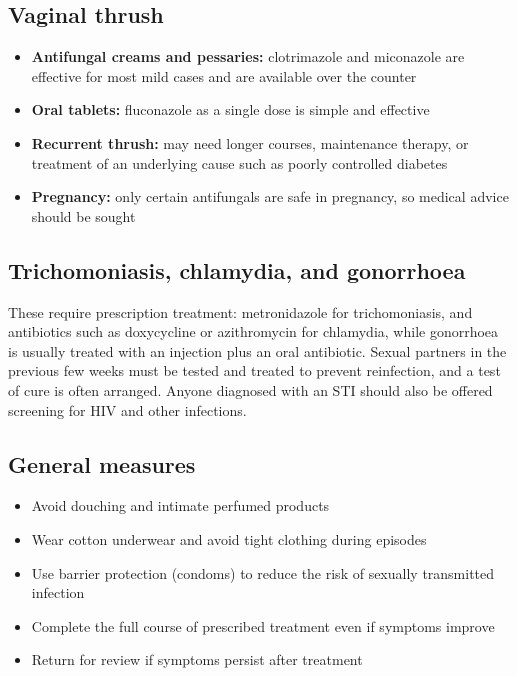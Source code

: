 \subsection*{Vaginal thrush}
\begin{itemize}
    \item \textbf{Antifungal creams and pessaries:} clotrimazole and miconazole are effective for most mild cases and are available over the counter
    \item \textbf{Oral tablets:} fluconazole as a single dose is simple and effective
    \item \textbf{Recurrent thrush:} may need longer courses, maintenance therapy, or treatment of an underlying cause such as poorly controlled diabetes
    \item \textbf{Pregnancy:} only certain antifungals are safe in pregnancy, so medical advice should be sought
\end{itemize}

\subsection*{Trichomoniasis, chlamydia, and gonorrhoea}
These require prescription treatment: metronidazole for trichomoniasis, and antibiotics such as doxycycline or azithromycin for chlamydia, while gonorrhoea is usually treated with an injection plus an oral antibiotic. Sexual partners in the previous few weeks must be tested and treated to prevent reinfection, and a test of cure is often arranged. Anyone diagnosed with an STI should also be offered screening for HIV and other infections.

\subsection*{General measures}
\begin{itemize}
    \item Avoid douching and intimate perfumed products
    \item Wear cotton underwear and avoid tight clothing during episodes
    \item Use barrier protection (condoms) to reduce the risk of sexually transmitted infection
    \item Complete the full course of prescribed treatment even if symptoms improve
    \item Return for review if symptoms persist after treatment
\end{itemize}


